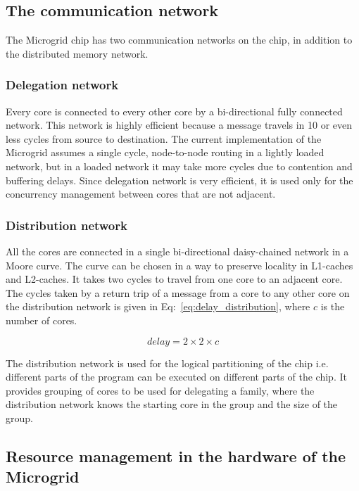 \documentclass{article}
\begin{document}
\subsection{The communication network}\label{com_network}

The Microgrid chip has two communication networks on the chip, in addition to
the distributed memory network. 

\subsubsection*{Delegation network}

Every core is connected to every other core by a bi-directional fully connected
network. This network is highly efficient because a message travels in 10 or
even less cycles from source to destination. The current implementation of the
Microgrid assumes a single cycle, node-to-node routing in a lightly loaded
network, but in a loaded network it may take more cycles due to contention and
buffering delays. Since delegation network is very efficient, it is used only
for the concurrency management between cores that are not adjacent.

\subsubsection*{Distribution network}

All the cores are connected in a single bi-directional daisy-chained network in
a Moore curve. The curve can be chosen in a way to preserve locality in
L1-caches and L2-caches. It takes two cycles to travel from one core to an
adjacent core. The cycles taken by a return trip of a message from a core to
any other core on the distribution network is given
in Eq:~\ref{eq:delay_distribution}, where $c$ is the number of cores. 

\begin{equation}
\label{eq:delay_distribution}
delay = 2 \times 2 \times c
\end{equation}

The distribution network is used for the logical partitioning of the chip i.e.
different parts of the program can be executed on different parts of the chip.
It provides grouping of cores to be used for delegating a family, where the
distribution network knows the starting core in the group and the size of the
group.

\subsection{Resource management in the hardware of the Microgrid}
\end{document}
